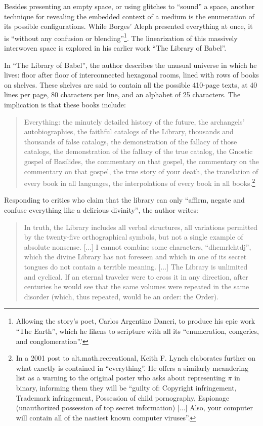 \documentclass{thesis}
\begin{document}
Besides presenting an empty space, or using glitches to ``sound'' a space, another technique for revealing the embedded context of a medium is the enumeration of its possible configurations. While Borges' Aleph presented everything at once, it is ``without any confusion or blending''\footnote{Allowing the story's poet, Carlos Argentino Daneri, to produce his epic work ``The Earth'', which he likens to scripture with all its ``enumeration, congeries, and conglomeration''.'}. The linearization of this massively interwoven space is explored in his earlier work ``The Library of Babel''\cite{borges_library_2000}.
	
In ``The Library of Babel'', the author describes the unusual universe in which he lives: floor after floor of interconnected hexagonal rooms, lined with rows of books on shelves. These shelves are said to contain all the possible 410-page texts, at 40 lines per page, 80 characters per line, and an alphabet of 25 characters. The implication is that these books include:

	\begin{quote}
	Everything: the minutely detailed history of the future, the archangels' autobiographies, the faithful catalogs of the Library, thousands and thousands of false catalogs, the demonstration of the fallacy of those catalogs, the demonstration of the fallacy of the true catalog, the Gnostic gospel of Basilides, the commentary on that gospel, the commentary on the commentary on that gospel, the true story of your death, the translation of every book in all languages, the interpolations of every book in all books.\footnote{In a 2001 post to alt.math.recreational, Keith F. Lynch elaborates further on what exactly is contained in ``everything''.\cite{keith_f._lynch_converting_????} He offers a similarly meandering list as a warning to the original poster who asks about representing $\pi$ in binary, informing them they will be ``guilty of: Copyright infringement, Trademark infringement, Possession of child pornography, Espionage (unauthorized possession of top secret information) [...] Also, your computer will contain all of the nastiest known computer viruses''.}
	\end{quote}

Responding to critics who claim that the library can only ``affirm, negate and confuse everything like a delirious divinity'', the author writes:
	
	\begin{quote}
	In truth, the Library includes all verbal structures, all variations permitted by the twenty-five orthographical symbols, but not a single example of absolute nonsense. [...] I cannot combine some characters, ``dhcmrlchtdj'', which the divine Library has not foreseen and which in one of its secret tongues do not contain a terrible meaning. [...] The Library is unlimited and cyclical. If an eternal traveler were to cross it in any direction, after centuries he would see that the same volumes were repeated in the same disorder (which, thus repeated, would be an order: the Order).
	\end{quote}
	
\end{document}
